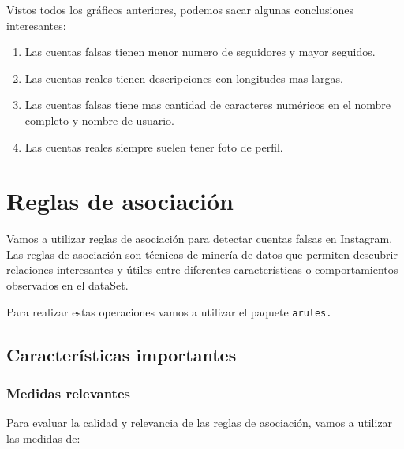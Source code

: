 \documentclass[
  letterpaper,
  DIV=11,
  numbers=noendperiod]{scrreprt}
\begin{document}
Vistos todos los gráficos anteriores, podemos sacar algunas conclusiones
interesantes:

\begin{enumerate}
\def\labelenumi{\arabic{enumi}.}
\item
  Las cuentas falsas tienen menor numero de seguidores y mayor seguidos.
\item
  Las cuentas reales tienen descripciones con longitudes mas largas.
\item
  Las cuentas falsas tiene mas cantidad de caracteres numéricos en el
  nombre completo y nombre de usuario.
\item
  Las cuentas reales siempre suelen tener foto de perfil.
\end{enumerate}


\chapter{Reglas de asociación}\label{reglas-de-asociaciuxf3n}

Vamos a utilizar reglas de asociación para detectar cuentas falsas en
Instagram. Las reglas de asociación son técnicas de minería de datos que
permiten descubrir relaciones interesantes y útiles entre diferentes
características o comportamientos observados en el dataSet.

Para realizar estas operaciones vamos a utilizar el paquete
\texttt{arules.}

\section{Características
importantes}\label{caracteruxedsticas-importantes}

\subsection{Medidas relevantes}\label{medidas-relevantes}

Para evaluar la calidad y relevancia de las reglas de asociación, vamos
a utilizar las medidas de:
\end{document}
